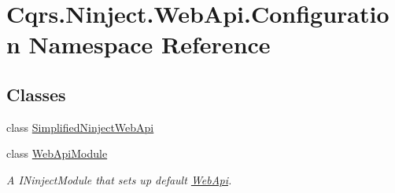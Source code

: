\hypertarget{namespaceCqrs_1_1Ninject_1_1WebApi_1_1Configuration}{}\section{Cqrs.\+Ninject.\+Web\+Api.\+Configuration Namespace Reference}
\label{namespaceCqrs_1_1Ninject_1_1WebApi_1_1Configuration}
\subsection*{Classes}
\begin{DoxyCompactItemize}
\item 
class \hyperlink{classCqrs_1_1Ninject_1_1WebApi_1_1Configuration_1_1SimplifiedNinjectWebApi}{Simplified\+Ninject\+Web\+Api}
\item 
class \hyperlink{classCqrs_1_1Ninject_1_1WebApi_1_1Configuration_1_1WebApiModule}{Web\+Api\+Module}
\begin{DoxyCompactList}\small\item\em A I\+Ninject\+Module that sets up default \hyperlink{namespaceCqrs_1_1Ninject_1_1WebApi}{Web\+Api}. \end{DoxyCompactList}\end{DoxyCompactItemize}
